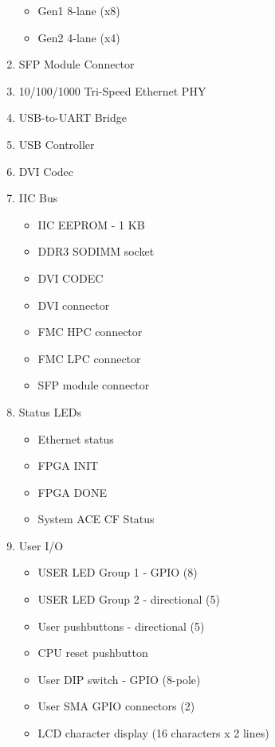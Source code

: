 \begin{enumerate}
  \begin{itemize}
    \item Gen1 8-lane (x8)
    \item Gen2 4-lane (x4)
  \end{itemize}

  \item SFP Module Connector
  \item 10/100/1000 Tri-Speed Ethernet PHY
  \item USB-to-UART Bridge
  \item USB Controller
  \item DVI Codec
  \item IIC Bus

  \begin{itemize}
    \item IIC EEPROM - 1 KB
    \item DDR3 SODIMM socket
    \item DVI CODEC
    \item DVI connector
    \item FMC HPC connector
    \item FMC LPC connector
    \item SFP module connector
  \end{itemize}

  \item Status LEDs

  \begin{itemize}
    \item Ethernet status
    \item FPGA INIT
    \item FPGA DONE
    \item System ACE CF Status
  \end{itemize}
  \item User I/O

  \begin{itemize}
    \item USER LED Group 1 - GPIO (8)
    \item USER LED Group 2 - directional (5)
    \item User pushbuttons - directional (5)
    \item CPU reset pushbutton
    \item User DIP switch - GPIO (8-pole)
    \item User SMA GPIO connectors (2)
    \item LCD character display (16 characters x 2 lines)
  \end{itemize}


\end{enumerate}
